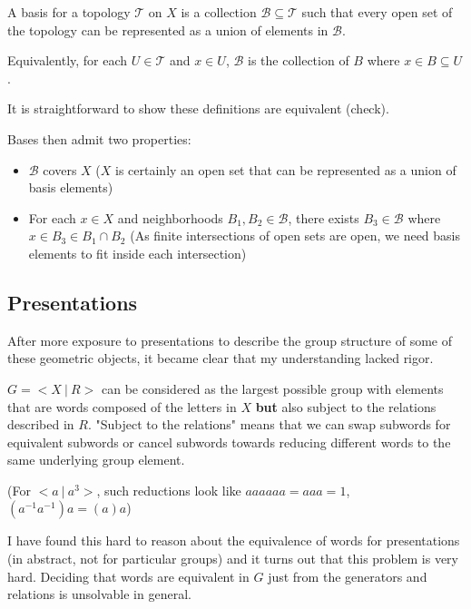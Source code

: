 \documentclass[10pt]{article}
\begin{document}
\begin{definition}[Basis]

	A basis for a topology $\mathscr{T}$ on $X$ is a collection $\mathscr{B}
	\subseteq \mathscr{T}$ such that every open set of the topology can be
	represented as a union of elements in $\mathscr{B}$.

	Equivalently, for each $U \in \mathscr{T}$ and $x \in U$, $\mathscr{B}$
	is the collection of $B$ where $x \in B \subseteq U$.

\end{definition}

It is straightforward to show these definitions are equivalent (check).

Bases then admit two properties:
\begin{itemize}
	\item{$\mathscr{B}$ covers $X$ ($X$ is certainly an open set that can be
		represented as a union of basis elements)}
\item{For each $x \in X$ and neighborhoods $B_1, B_2 \in \mathscr{B}$, there exists $B_3 \in
	\mathscr{B}$ where $x \in B_3 \in B_1 \cap B_2$ (As finite intersections of
open sets are open, we need basis elements to fit inside each intersection)}
\end{itemize}

\subsection{Presentations}

After more exposure to presentations to describe the group structure of some of
these geometric objects, it became clear that my understanding lacked rigor.

$G = <X~|~R>$ can be considered as the largest possible group with elements
that are words composed of the letters in $X$ \textbf{but} also subject to the
relations described in $R$. "Subject to the relations" means that we can swap
subwords for equivalent subwords or cancel subwords towards reducing different
words to the same underlying group element. 

(For $<a ~|~a^3>$, such reductions look like $aaaaaa = aaa = 1$, $(a^{-1}a^{-1})a = (a)a$)

I have found this hard to reason about the equivalence of words for
presentations (in abstract, not for particular groups) and it turns out that
this problem is very hard. Deciding that words are equivalent in $G$ just from
the generators and relations is unsolvable in general.
\end{document}
